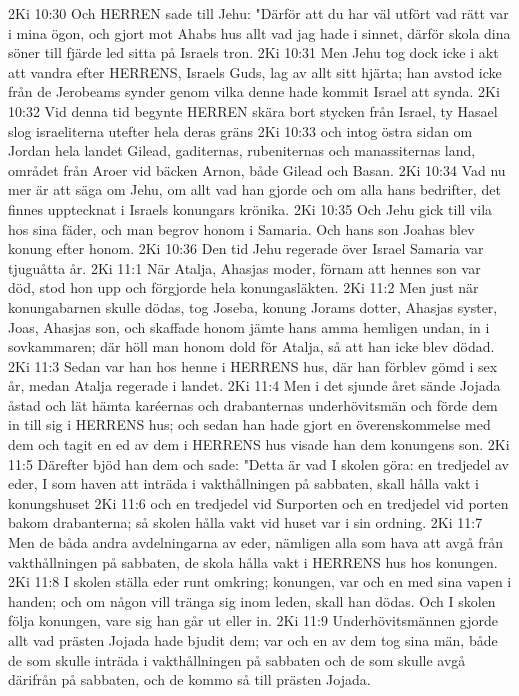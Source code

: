 2Ki 10:30  Och HERREN sade till Jehu: "Därför att du har väl utfört vad rätt var i mina ögon, och gjort mot Ahabs hus allt vad jag hade i sinnet, därför skola dina söner till fjärde led sitta på Israels tron.
2Ki 10:31  Men Jehu tog dock icke i akt att vandra efter HERRENS, Israels Guds, lag av allt sitt hjärta; han avstod icke från de Jerobeams synder genom vilka denne hade kommit Israel att synda.
2Ki 10:32  Vid denna tid begynte HERREN skära bort stycken från Israel, ty Hasael slog israeliterna utefter hela deras gräns
2Ki 10:33  och intog östra sidan om Jordan hela landet Gilead, gaditernas, rubeniternas och manassiternas land, området från Aroer vid bäcken Arnon, både Gilead och Basan.
2Ki 10:34  Vad nu mer är att säga om Jehu, om allt vad han gjorde och om alla hans bedrifter, det finnes upptecknat i Israels konungars krönika.
2Ki 10:35  Och Jehu gick till vila hos sina fäder, och man begrov honom i Samaria. Och hans son Joahas blev konung efter honom.
2Ki 10:36  Den tid Jehu regerade över Israel Samaria var tjuguåtta år.
2Ki 11:1  När Atalja, Ahasjas moder, förnam att hennes son var död, stod hon upp och förgjorde hela konungasläkten.
2Ki 11:2  Men just när konungabarnen skulle dödas, tog Joseba, konung Jorams dotter, Ahasjas syster, Joas, Ahasjas son, och skaffade honom jämte hans amma hemligen undan, in i sovkammaren; där höll man honom dold för Atalja, så att han icke blev dödad.
2Ki 11:3  Sedan var han hos henne i HERRENS hus, där han förblev gömd i sex år, medan Atalja regerade i landet.
2Ki 11:4  Men i det sjunde året sände Jojada åstad och lät hämta karéernas och drabanternas underhövitsmän och förde dem in till sig i HERRENS hus; och sedan han hade gjort en överenskommelse med dem och tagit en ed av dem i HERRENS hus visade han dem konungens son.
2Ki 11:5  Därefter bjöd han dem och sade: "Detta är vad I skolen göra: en tredjedel av eder, I som haven att inträda i vakthållningen på sabbaten, skall hålla vakt i konungshuset
2Ki 11:6  och en tredjedel vid Surporten och en tredjedel vid porten bakom drabanterna; så skolen hålla vakt vid huset var i sin ordning.
2Ki 11:7  Men de båda andra avdelningarna av eder, nämligen alla som hava att avgå från vakthållningen på sabbaten, de skola hålla vakt i HERRENS hus hos konungen.
2Ki 11:8  I skolen ställa eder runt omkring; konungen, var och en med sina vapen i handen; och om någon vill tränga sig inom leden, skall han dödas. Och I skolen följa konungen, vare sig han går ut eller in.
2Ki 11:9  Underhövitsmännen gjorde allt vad prästen Jojada hade bjudit dem; var och en av dem tog sina män, både de som skulle inträda i vakthållningen på sabbaten och de som skulle avgå därifrån på sabbaten, och de kommo så till prästen Jojada.
